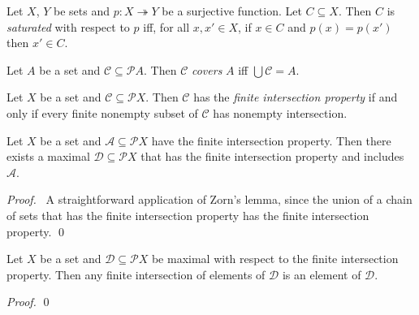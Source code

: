 \begin{df}[Saturated]
  Let $X$, $Y$ be sets and $p : X \twoheadrightarrow Y$ be a surjective
  function. Let $C \subseteq X$. Then $C$ is \emph{saturated} with respect to
  $p$ iff, for all $x, x' \in X$, if $x \in C$ and $p(x) = p(x')$ then $x'
  \in
  C$.
\end{df}

\begin{df}[Cover]
  Let $A$ be a set and $\mathcal{C} \subseteq \mathcal{P}
  A$. Then $\mathcal{C}$ \emph{covers} $A$ iff $\bigcup \mathcal{C} = A$.
\end{df}

\begin{df}
  Let $X$ be a set and $\mathcal{C} \subseteq \mathcal{P} X$. Then
  $\mathcal{C}$ has the \emph{finite intersection property} if and only if
  every finite nonempty subset of $\mathcal{C}$ has nonempty intersection.
\end{df}

\begin{lm}[AC]
  \label{lm:sets:finite_intersection_property:maximal}
  Let $X$ be a set and $\mathcal{A} \subseteq \mathcal{P} X$ have the finite intersection property. Then there exists
  a maximal $\mathcal{D} \subseteq \mathcal{P} X$ that has the finite intersection property and includes $\mathcal{A}$.
\end{lm}

\begin{proof}
  \pf\ A straightforward application of Zorn's lemma, since the union of a chain of sets that has the finite intersection property has the finite intersection property. \qed
\end{proof}

\begin{lm}
  \label{lm:sets:finite_intersection_property:finite_intersection}
  Let $X$ be a set and $\mathcal{D} \subseteq \mathcal{P} X$ be maximal with respect to the finite intersection property. Then any finite intersection of elements of $\mathcal{D}$ is an element of $\mathcal{D}$.
\end{lm}

\begin{proof}
  \pf
  \qed
\end{proof}

